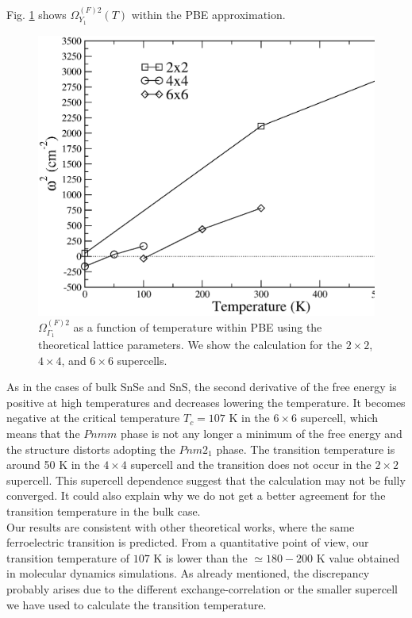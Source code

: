 Fig. \ref{freq-transition-mono} shows $\Omega^{(F)2}_{Y_{1}}(T)$ within the PBE approximation.
\begin{figure}[h]
\includegraphics[width=\linewidth]{Figures/freq-mono.eps}
\caption[Phonon collapse in monolayer SnSe.]{$\Omega^{(F)2}_{\Gamma_{1}}$ as a function of temperature within PBE 
using the theoretical lattice parameters. We show the calculation for the $2\times2$, $4\times4$, and $6\times6$ 
supercells.}
\label{freq-transition-mono}
\end{figure}
As in the cases of bulk SnSe and SnS, the second derivative of the free energy is positive at high temperatures and 
decreases lowering the temperature. It becomes negative at the critical temperature 
$T_{c}=107$ K in the $6\times6$ supercell, which means that the $Pnmm$ phase is not any longer a minimum of the free 
energy and the structure distorts adopting the $Pnm2_{1}$ phase. The transition temperature is around 50 K in the 
$4\times4$ supercell and the transition does not occur in the $2\times2$ supercell. This supercell dependence 
suggest that the calculation may not be fully converged. It could also explain why we do not get a better 
agreement for the transition temperature in the bulk case. \\

Our results are consistent with other theoretical 
works\cite{mehboudi2016structural,barraza2018tuning,fei2016ferroelectricity}, where the same ferroelectric 
transition is predicted. From a quantitative point of view, our transition temperature of $107$ K is lower than the 
$\simeq180-200$ K value obtained in molecular dynamics simulations\cite{mehboudi2016structural,barraza2018tuning}. 
As already mentioned, the discrepancy probably arises due to the different exchange-correlation or the smaller 
supercell we have used to calculate the transition temperature.

